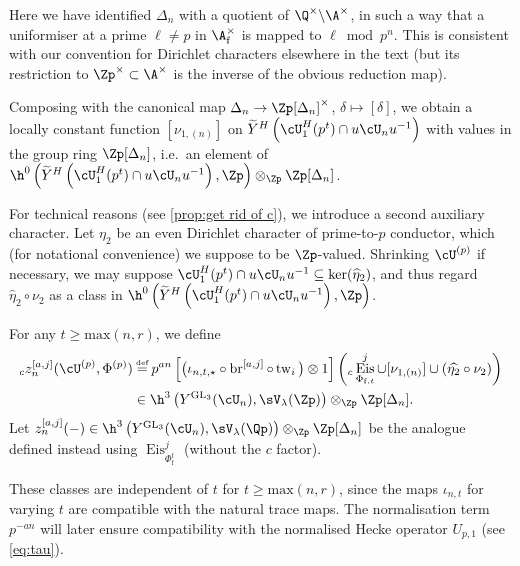 \documentclass[10pt,reqno,a4paper]{amsart}
\newcommand{\subft}{_{\mathrm{f},t}}
\newcommand{\Phift}{\Phi\subft}
\newcommand{\subf}{_{\mathrm{f}}}
\DeclareMathOperator{\Eis}{Eis}
\newcommand{\GL}{\mathrm{GL}}
\begin{document}
\begin{remark}\label{rem:dirichlet convention}
Here we have identified $\Delta_n$ with a quotient of $\Q^\times \backslash \A^\times$, in such a way that a uniformiser at a prime $\ell \ne p$ in $\A\subf^\times$ is mapped to $\ell \bmod p^n$. This is consistent with our convention for Dirichlet characters elsewhere in the text (but its restriction to $\Zp^\times \subset \A^\times$ is the inverse of the obvious reduction map).
\end{remark}
Composing with the canonical map $\Delta_n \to \Zp[\Delta_n]^\times$, $\delta \mapsto [\delta]$, we obtain a locally constant function $[\nu_{1, (n)}]$ on $\widetilde{Y}^H\left(\cU_{1}^H(p^t) \cap u \cU_n u^{-1}\right)$ with values in the group ring $\Zp[\Delta_n]$, i.e.~an element of $\h^0\left(\widetilde{Y}^H\left(\cU_{1}^H(p^t) \cap u \cU_n u^{-1}\right), \Zp\right) \otimes_{\Zp} \Zp[\Delta_n]$.

\begin{notation}\label{not:eta_2}  For technical reasons (see \cref{prop:get rid of c}), we introduce a second auxiliary character. Let $\eta_2$ be an even Dirichlet character of prime-to-$p$ conductor, which (for notational convenience) we suppose to be $\Zp$-valued. Shrinking $\cU^{(p)}$ if necessary, we may suppose $\cU_{1}^H(p^t) \cap u \cU_n u^{-1} \subseteq \ker(\widehat{\eta}_{2})$, and thus regard $\widehat{\eta}_{2} \circ \nu_2$ as a class in $\h^0\left(\widetilde{Y}^H\left(\cU_{1}^H(p^t) \cap u \cU_n u^{-1}\right), \Zp\right)$.
\end{notation}

\begin{definition}\label{def:zaj}
For any $t \geq \mathrm{max}(n,r)$, we define
\begin{align*}
	{}_cz_{n}^{[a,j]}(\cU^{(p)}, \Phi^{(p)}) &\defeq p^{an} \left[ \big(\iota_{n,t, \star} \circ \operatorname{br}^{[a,j]}\circ \operatorname{tw}_i\big) \otimes 1\right]\left({}_c \Eis^{j}_{\Phift} \cup [\nu_{1, (n)}] \cup (\widehat{\eta_2} \circ \nu_2)\right)\\
	& \in   \h^3\left(Y^{\GL_3}(\cU_n), \sV_\lambda(\Zp)\right) \otimes_{\Zp} \Zp[\Delta_n].
\end{align*}
Let $z_{n}^{[a,j]}(-) \in \h^3\left(Y^{\GL_3}(\cU_n), \sV_\lambda(\Qp)\right) \otimes_{\Zp} \Zp[\Delta_n]$ be the analogue defined instead using $\Eis_{\Phi\subf^t}^j$ (without the $c$ factor).
\end{definition}

These classes are independent of $t$ for $t \ge \mathrm{max}(n,r)$, since the maps $\iota_{n, t}$ for varying $t$ are compatible with the natural trace maps. The normalisation term $p^{-an}$ will later ensure compatibility with the normalised Hecke operator $U_{p,1}$ (see \eqref{eq:tau}).
\end{document}

